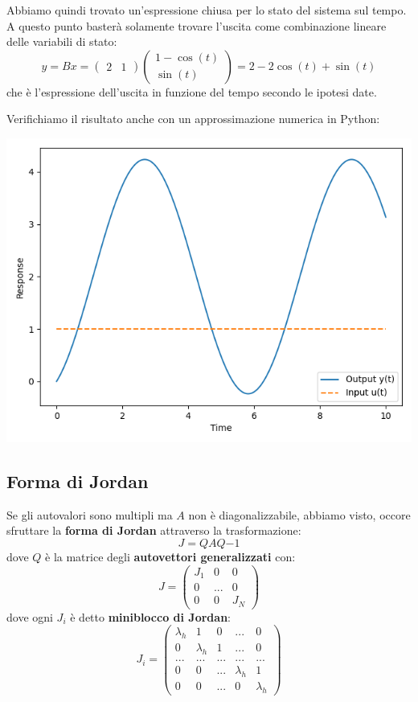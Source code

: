 \documentclass[a4paper,11pt]{article}
\begin{document}
Abbiamo quindi trovato un'espressione chiusa per lo stato del sistema sul tempo.
A questo punto basterà solamente trovare l'uscita come combinazione lineare delle variabili di stato:
$$
y = Bx = \begin{pmatrix}
	2 & 1
\end{pmatrix}
\begin{pmatrix}
1 - \cos(t) \\ 
\sin(t)
\end{pmatrix}
=
2 - 2\cos(t) + \sin(t)
$$
che è l'espressione dell'uscita in funzione del tempo secondo le ipotesi date.

Verifichiamo il risultato anche con un approssimazione numerica in Python:

\begin{center}
\includegraphics[scale=0.8]{../figures/first-degree-input-diffeq.png}
\end{center}

\subsection{Forma di Jordan}
Se gli autovalori sono multipli ma $A$ non è diagonalizzabile, abbiamo visto, occore sfruttare la \textbf{forma di Jordan} attraverso la trasformazione:
$$
J = Q A Q{-1}
$$
dove $Q$ è la matrice degli \textbf{autovettori generalizzati} con:
$$
J = \begin{pmatrix}
	J_1 & 0 & 0 \\
	0 & ... & 0 \\
	0 & 0 & J_N
\end{pmatrix}
$$
dove ogni $J_i$ è detto \textbf{miniblocco di Jordan}:
$$
J_i = \begin{pmatrix}
	\lambda_h & 1 & 0 & ... & 0 \\ 
	0 & \lambda_h & 1 & ... & 0 \\ 
	... & ... & ... & ... & ... \\ 
	0 & 0 & ... & \lambda_h & 1 \\
	0 & 0 & ... & 0 & \lambda_h
\end{pmatrix}
$$
\end{document}
